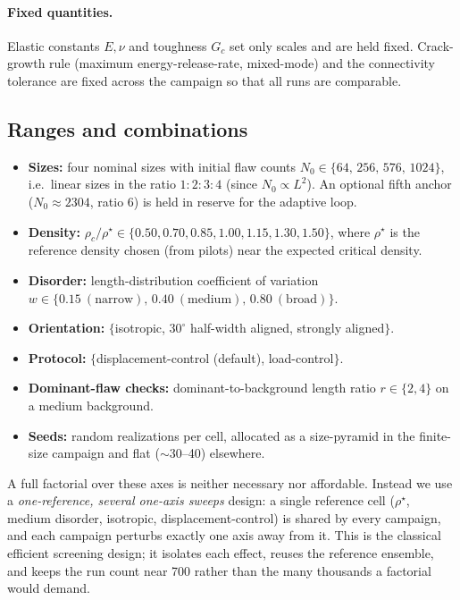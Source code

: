 \documentclass[11pt]{article}
\newcommand{\rhoc}{\rho_c}
\newcommand{\rhostar}{\rho^{\star}}
\begin{document}
\paragraph{Fixed quantities.}
Elastic constants $E,\nu$ and toughness $G_c$ set only scales and are held fixed.
Crack-growth rule (maximum energy-release-rate, mixed-mode) and the connectivity
tolerance are fixed across the campaign so that all runs are comparable.

\subsection{Ranges and combinations}

\begin{itemize}
\item \textbf{Sizes:} four nominal sizes with initial flaw counts
$N_0 \in \{64,\,256,\,576,\,1024\}$, i.e.\ linear sizes in the ratio
$1\!:\!2\!:\!3\!:\!4$ (since $N_0\propto L^2$). An optional fifth anchor
($N_0\approx 2304$, ratio 6) is held in reserve for the adaptive loop.
\item \textbf{Density:} $\rhoc/\rhostar \in \{0.50,0.70,0.85,1.00,1.15,1.30,1.50\}$,
where $\rhostar$ is the reference density chosen (from pilots) near the expected
critical density.
\item \textbf{Disorder:} length-distribution coefficient of variation
$w \in \{0.15\ (\text{narrow}),\,0.40\ (\text{medium}),\,0.80\ (\text{broad})\}$.
\item \textbf{Orientation:} $\{$isotropic, $30^\circ$ half-width aligned, strongly
aligned$\}$.
\item \textbf{Protocol:} $\{$displacement-control (default), load-control$\}$.
\item \textbf{Dominant-flaw checks:} dominant-to-background length ratio
$r \in \{2,4\}$ on a medium background.
\item \textbf{Seeds:} random realizations per cell, allocated as a size-pyramid in the
finite-size campaign and flat ($\sim$30--40) elsewhere.
\end{itemize}

A full factorial over these axes is neither necessary nor affordable. Instead we use a
\emph{one-reference, several one-axis sweeps} design: a single reference cell
($\rhostar$, medium disorder, isotropic, displacement-control) is shared by every
campaign, and each campaign perturbs exactly one axis away from it. This is the
classical efficient screening design; it isolates each effect, reuses the reference
ensemble, and keeps the run count near 700 rather than the many thousands a factorial
would demand.
\end{document}
